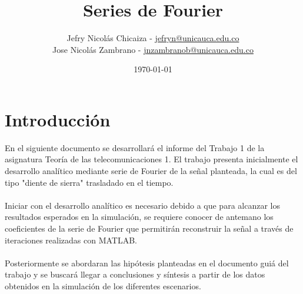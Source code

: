 \documentclass[12pt]{article}
\date{\today}.
\title{\textbf{Series de Fourier}}
\author{
    Jefry Nicolás Chicaiza - \url{jefryn@unicauca.edu.co}\\
    Jose Nicolás Zambrano - \url{jnzambranob@unicauca.edu.co}
}
\date{}
\begin{document}
\maketitle
\thispagestyle{fancy}
\section*{Introducción}
    En el siguiente documento se desarrollará el informe del Trabajo 1 de la asignatura 
    Teoría de las telecomunicaciones 1. El trabajo presenta inicialmente el desarrollo 
    analítico mediante serie de Fourier de la señal planteada, la cual es del tipo 
    "diente de sierra" trasladado en el tiempo.\\
    \\
    Iniciar con el desarrollo analítico es necesario debido a que para alcanzar los 
    resultados esperados en la simulación, se requiere conocer de antemano los coeficientes 
    de la serie de Fourier que permitirán reconstruir la señal a través de iteraciones 
    realizadas con MATLAB.\\
    \\
    Posteriormente se abordaran las hipótesis planteadas en el documento guiá del trabajo 
    y se buscará llegar a conclusiones y síntesis a partir de los datos obtenidos en la 
    simulación de los diferentes escenarios.\\
    \\
\end{document}
